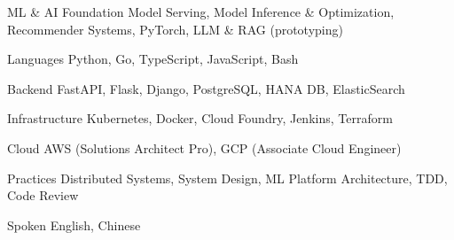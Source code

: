 

\begin{cvskills}

  \cvskill
    {ML \& AI} %
    {Foundation Model Serving, Model Inference \& Optimization, Recommender Systems, PyTorch, LLM \& RAG (prototyping)} %

  \cvskill
    {Languages} %
    {Python, Go, TypeScript, JavaScript, Bash} %

  \cvskill
    {Backend} %
    {FastAPI, Flask, Django, PostgreSQL, HANA DB, ElasticSearch} %

  \cvskill
    {Infrastructure} %
    {Kubernetes, Docker, Cloud Foundry, Jenkins, Terraform} %

  \cvskill
    {Cloud} %
    {AWS (Solutions Architect Pro), GCP (Associate Cloud Engineer)} %

  \cvskill
    {Practices} %
    {Distributed Systems, System Design, ML Platform Architecture, TDD, Code Review} %

  \cvskill
    {Spoken} %
    {English, Chinese} %


\end{cvskills}
